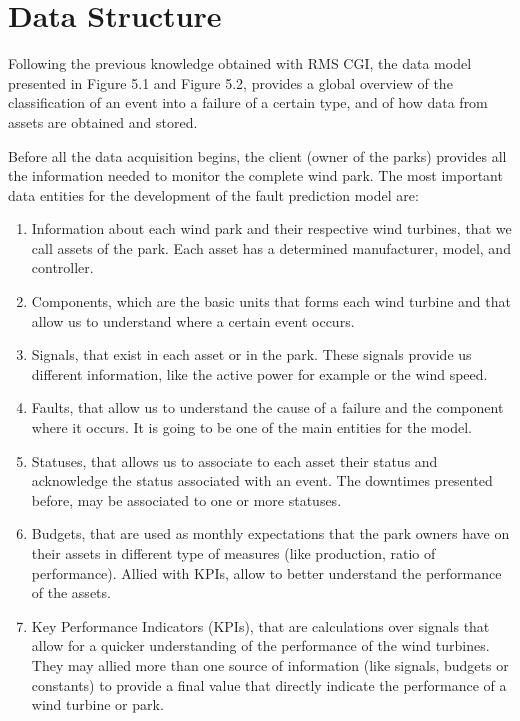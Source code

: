 \section{Data Structure} 
\label{sub:if_you_use_this_template} 

Following the previous knowledge obtained with RMS CGI, the data model presented in Figure 5.1 and Figure 5.2, provides a global overview of the classification of an event into a failure of a certain type, and of how data from assets are obtained and stored.

Before all the data acquisition begins, the client (owner of the parks) provides all the information needed to monitor the complete wind park. The most important data entities for the development of the fault prediction model are:

\begin{enumerate}
    \item 
Information about each wind park and their respective wind turbines, that we call assets of the park. Each asset has a determined manufacturer, model, and controller.
    \item
Components, which are the basic units that forms each wind turbine and that allow us to understand where a certain event occurs.
    \item
Signals, that exist in each asset or in the park. These signals provide us different information, like the active power for example or the wind speed.
    \item
Faults, that allow us to understand the cause of a failure and the component where it occurs. It is going to be one of the main entities for the model.
    \item
Statuses, that allows us to associate to each asset their status and acknowledge the status associated with an event. The downtimes presented before, may be associated to one or more statuses.
    \item
Budgets, that are used as monthly expectations that the park owners have on their assets in different type of measures (like production, ratio of performance). Allied with KPIs, allow to better understand the performance of the assets.
    \item
Key Performance Indicators (KPIs), that are calculations over signals that allow for a quicker understanding of the performance of the wind turbines. They may allied more than one source of information (like signals, budgets or constants) to provide a final value that directly indicate the performance of a wind turbine or park.
\end{enumerate}

